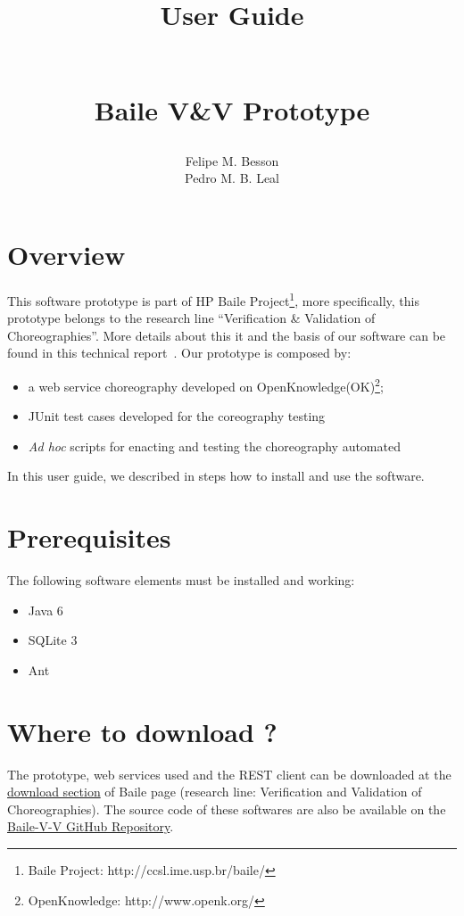 \documentclass{article}	%
\author{Felipe M. Besson \\ Pedro M. B. Leal}
\title{\begin{huge}\textbf{User Guide}\end{huge} \\ Baile V\&V Prototype}
\begin{document}
	
\maketitle			

\date 

\newpage
\section { Overview }
This software prototype is part of HP Baile Project\footnote{Baile Project: http://ccsl.ime.usp.br/baile/}, more specifically, 
this prototype belongs to the research line ``Verification \& Validation of Choreographies''. More details about this it and the
basis of our software can be found in this technical report~\cite{tech-report}. Our prototype is composed by:

\begin{itemize}
 \item a web service choreography developed on OpenKnowledge(OK)\footnote{OpenKnowledge: http://www.openk.org/};
 \item JUnit test cases developed for the coreography testing
 \item \textit{Ad hoc} scripts for enacting and testing the choreography automated
\end{itemize}

In this user guide, we described in steps how to install and use the software.


\section{ Prerequisites}
The following software elements must be installed and working:

\begin{itemize}
 \item Java 6~\cite{java6}
 \item SQLite 3~\cite{sql3}
 \item Ant~\cite{ant}
\end{itemize}

\section{ Where to download ? }
The prototype, web services used and the REST client can be downloaded at the \href{http://ccsl.ime.usp.br/baile/files}{download section} of Baile page (research line: Verification and Validation of Choreographies). The source code of these softwares are also be available on the \href{https://github.com/pedrombl/Baile-V-V/}{Baile-V-V GitHub Repository}. 
\end{document}
